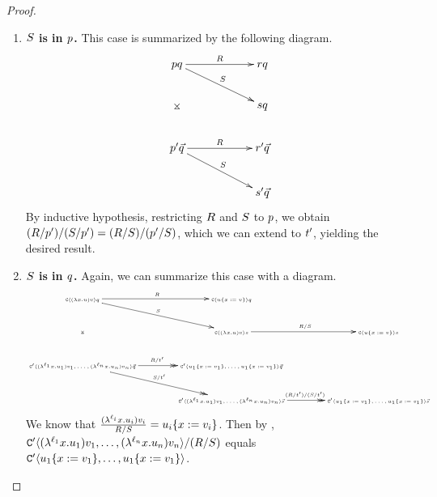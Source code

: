 \begin{proof}
\begin{enumerate}
\begin{enumerate}
\begin{enumerate}
          \item {\bf $S$ is in $p$.} This case is summarized by the following diagram.
            \[
            \xymatrix@C=2cm{
              \tmfive \tmsix
                \ar@{->}[r]^{\redex} \ar@{->}[rd]^{\redextwo} \ar@{}[dd]|*=0[@]{\rtimes}
                  & \tmfour \tmsix \\
                & \tmtwo \tmsix \\
                \ar@{->}[r]^{\redex} \ar@{->}[rd]^{\redextwo}
              \tmfive' \ls{\tmsix}
                  & \tmfour' \ls{\tmsix} \\
                & \tmtwo' \ls{\tmsix} \\
              }
            \]
            By inductive hypothesis, restricting $R$ and $S$ to $p$, we obtain
            $(R / p') / (S / p') = (R / S) / (p' / S)$,
            which we can extend to $t'$, yielding the desired result.
          \item {\bf $S$ is in $q$.} Again, we can summarize this case with a diagram.
            \[
            {\tiny
            \xymatrix@C=1.4cm{
              \conof{(\lam{\var}{\tmthree}) \tmthreevariant} \tmsix
                \ar@{->}[r]^{\redex} \ar@{->}[rd]^{\redextwo} \ar@{}[dd]|*=0[@]{\rtimes}
                  & \conof{\subs{\tmthree}{\var}{\tmthreevariant}} \tmsix  & \\
                & \conof{(\lam{\var}{\tmthree}) \tmthreevariant} \tmtwo \ar@{->}[r]^{\redex / \redextwo}
                    & \conof{\subs{\tmthree}{\var}{\tmthreevariant}} \tmtwo \\
                \ar@{->>}[r]^{\redex / \tm'} \ar@{->>}[rd]^{\redextwo / \tm'}
              \contwoof{(\lamp{\lab_1}{\var}{\tmthree_1}) \tmthreevariant_1, \hdots, (\lamp{\lab_n}{\var}{\tmthree_n}) \tmthreevariant_n} \ls{\tmsix}
                  & \contwoof{\subs{\tmthree_1}{\var}{\tmthreevariant_1}, \hdots, \subs{\tmthree_1}{\var}{\tmthreevariant_1}} \ls{\tmsix} & \\
                & \contwoof{(\lamp{\lab_1}{\var}{\tmthree_1}) \tmthreevariant_1, \hdots, (\lamp{\lab_n}{\var}{\tmthree_n}) \tmthreevariant_n} \ls{\tmtwo} \ar@{->>}[r]^{(\redex / \tm') / (\redextwo / \tm')}
                  & \contwoof{\subs{\tmthree_1}{\var}{\tmthreevariant_1}, \hdots, \subs{\tmthree_1}{\var}{\tmthreevariant_1}} \ls{\tmtwo} \\
              }
            }
            \]
            We know that $\frac{(\lambda^{\ell_i} x. u_i) v_i}{R / S}
             = u_i\{x := v_i\}$.
            Then by ,
            $\mathtt{C}'\langle(\lambda^{\ell_1} x. u_1) v_1, \hdots, (\lambda^{\ell_n} x. u_n) v_n\rangle / (R / S)$ equals
            $\mathtt{C}'\langle u_1\{x := v_1\}, \hdots, u_1\{x := v_1\}\rangle$.


\end{enumerate}
\end{enumerate}
\end{enumerate}
\end{proof}
